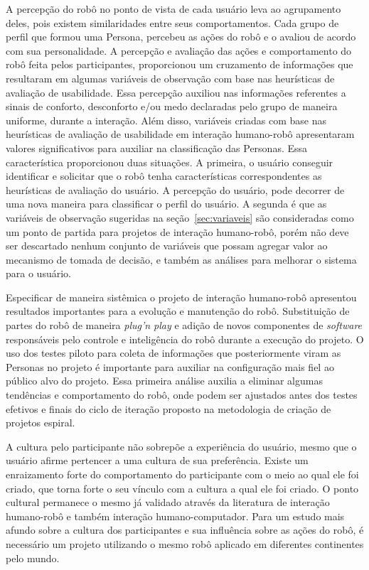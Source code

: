 A percepção do robô no ponto de vista de cada usuário leva ao agrupamento deles, pois existem similaridades entre seus comportamentos. Cada grupo de perfil que formou uma Persona, percebeu as ações do robô e o avaliou de acordo com sua personalidade. A percepção e avaliação das ações e comportamento do robô feita pelos participantes, proporcionou um cruzamento de informações que resultaram em algumas variáveis de observação com base nas heurísticas de avaliação de usabilidade. Essa percepção auxiliou nas informações referentes a sinais de conforto, desconforto e/ou medo declaradas pelo grupo de maneira uniforme, durante a interação. Além disso, variáveis criadas com base nas heurísticas de avaliação de usabilidade em interação humano-robô apresentaram valores significativos para auxiliar na classificação das Personas. Essa característica proporcionou duas situações. A primeira, o usuário conseguir identificar e solicitar que o robô tenha características correspondentes as heurísticas de avaliação do usuário. A percepção do usuário, pode decorrer de uma nova maneira para classificar o perfil do usuário. A segunda é que as variáveis de observação sugeridas na seção~\ref{sec:variaveis} são consideradas como um ponto de partida para projetos de interação humano-robô, porém não deve ser descartado nenhum conjunto de variáveis que possam agregar valor ao mecanismo de tomada de decisão, e também as análises para melhorar o sistema para o usuário.

Especificar de maneira sistêmica o projeto de interação humano-robô apresentou resultados importantes para a evolução e manutenção do robô. Substituição de partes do robô de maneira \emph{plug'n play} e adição de novos componentes de \emph{software} responsáveis pelo controle e inteligência do robô durante a execução do projeto. O uso dos testes piloto para coleta de informações que posteriormente viram as Personas no projeto é importante para auxiliar na configuração mais fiel ao público alvo do projeto. Essa primeira análise auxilia a eliminar algumas tendências e comportamento do robô, onde podem ser ajustados antes dos testes efetivos e finais do ciclo de iteração proposto na metodologia de criação de projetos espiral.

A cultura pelo participante não sobrepõe a experiência do usuário, mesmo que o usuário afirme pertencer a uma cultura de sua preferência. Existe um enraizamento forte do comportamento do participante com o meio ao qual ele foi criado, que torna forte o seu vínculo com a cultura a qual ele foi criado. O ponto cultural permanece o mesmo já validado através da literatura de interação humano-robô e também interação humano-computador. Para um estudo mais afundo sobre a cultura dos participantes e sua influência sobre as ações do robô, é necessário um projeto utilizando o mesmo robô aplicado em diferentes continentes pelo mundo.

